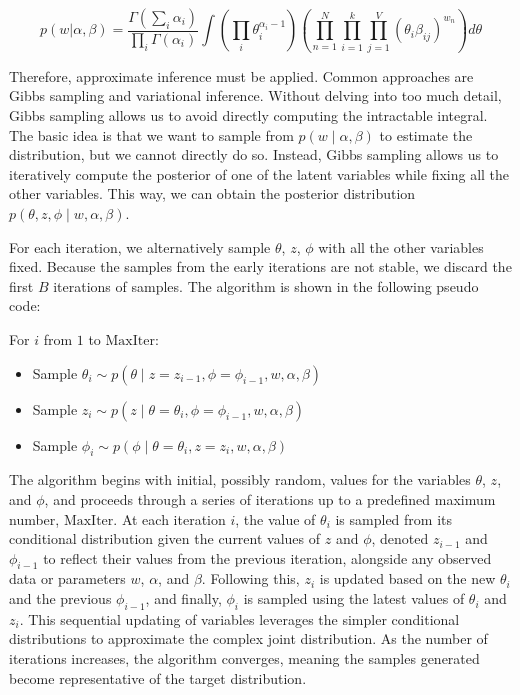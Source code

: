 \documentclass{article}
\begin{document}
\[ p(w | \alpha, \beta) = \frac{\Gamma(\sum_i \alpha_i)}{\prod_i \Gamma(\alpha_i)} \int \left( \prod_i \theta_i^{\alpha_i - 1} \right) \left( \prod_{n=1}^{N} \prod_{i=1}^{k} \prod_{j=1}^{V} (\theta_i \beta_{ij})^{w_{n}} \right) d\theta \]

Therefore, approximate inference must be applied. Common approaches are Gibbs sampling and variational inference. Without delving into too much detail, Gibbs sampling allows us to avoid directly computing the intractable integral. The basic idea is that we want to sample from \(p(w \mid \alpha, \beta)\) to estimate the distribution, but we cannot directly do so. Instead, Gibbs sampling allows us to iteratively compute the posterior of one of the latent variables while fixing all the other variables. This way, we can obtain the posterior distribution \(p(\theta, z, \phi \mid w, \alpha, \beta)\).

For each iteration, we alternatively sample \(\theta\), \(z\), \(\phi\) with all the other variables fixed. Because the samples from the early iterations are not stable, we discard the first \(B\) iterations of samples. The algorithm is shown in the following pseudo code:


For \(i\) from \(1\) to \(\text{MaxIter}\):
\begin{itemize}
    \item Sample \(\theta_{i} \sim p(\theta \mid z = z_{i-1}, \phi = \phi_{i-1}, w, \alpha, \beta)\)
    \item Sample \(z_{i} \sim p(z \mid \theta = \theta_{i}, \phi = \phi_{i-1}, w, \alpha, \beta)\)
    \item Sample \(\phi_{i} \sim p(\phi \mid \theta = \theta_{i}, z = z_{i}, w, \alpha, \beta)\)
\end{itemize}

The algorithm begins with initial, possibly random, values for the variables \(\theta\), \(z\), and \(\phi\), and proceeds through a series of iterations up to a predefined maximum number, \(\text{MaxIter}\). At each iteration \(i\), the value of \(\theta_i\) is sampled from its conditional distribution given the current values of \(z\) and \(\phi\), denoted \(z_{i-1}\) and \(\phi_{i-1}\) to reflect their values from the previous iteration, alongside any observed data or parameters \(w\), \(\alpha\), and \(\beta\). Following this, \(z_i\) is updated based on the new \(\theta_i\) and the previous \(\phi_{i-1}\), and finally, \(\phi_i\) is sampled using the latest values of \(\theta_i\) and \(z_i\). This sequential updating of variables leverages the simpler conditional distributions to approximate the complex joint distribution. As the number of iterations increases, the algorithm converges, meaning the samples generated become representative of the target distribution.
\end{document}
